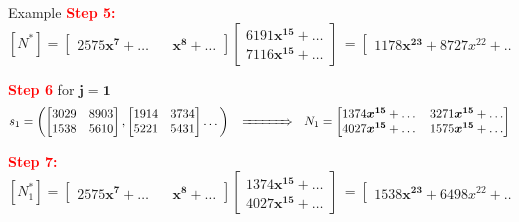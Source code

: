 \documentclass[final]{beamer}
\newlength{\twocolwid}
\begin{document}
\begin{frame}[t]
\begin{columns}[t]
\begin{column}{\twocolwid}
\begin{alertblock}{{\sf Example}}
		\textcolor{red}{\bf Step 5:}
		$  [N^*] = \begin{bmatrix}
		2575\boldsymbol{x^7}+\dots ~~&~~ \boldsymbol{x^8} + \dots
		\end{bmatrix}
                \begin{bmatrix}
		6191\boldsymbol{x^{15}} + \dots\\
		7116\boldsymbol{x^{15}} + \dots
		\end{bmatrix}\,
=                \begin{bmatrix}
  1178\boldsymbol{x^{23}} + 8727x^{22} + \dots
\end{bmatrix}
		$

		\textcolor{red}{\bf Step 6} for $\boldsymbol{j = 1}$
	$$ s_1 = \left(
		\begin{bmatrix}
		3029& 8903\\
		1538& 5610
		\end{bmatrix},
		\begin{bmatrix}
		1914&3734\\
		5221&5431
		\end{bmatrix}
		\dots
		\right)\,
                ~~\xRightarrow{~~~~~~~~~~}~~
		N_1 = \begin{bmatrix}
		1374\boldsymbol{x^{15}} + \dots & 3271\boldsymbol{x^{15}} + \dots\\
		4027\boldsymbol{x^{15}} + \dots & 1575\boldsymbol{x^{15}} + \dots
		\end{bmatrix}
		$$
	
		\textcolor{red}{\bf Step 7:}
		$  [N_1^*] = \begin{bmatrix}
		2575\boldsymbol{x^7}+\dots ~~&~~ \boldsymbol{x^8} + \dots
		\end{bmatrix}
                \begin{bmatrix}
		1374\boldsymbol{x^{15}} + \dots\\
		4027\boldsymbol{x^{15}} + \dots
		\end{bmatrix}\,
=                \begin{bmatrix}
  1538\boldsymbol{x^{23}} + 6498x^{22} + \dots
\end{bmatrix}
		$

	


\end{alertblock}
\end{column}
\end{columns}
\end{frame}
\end{document}
